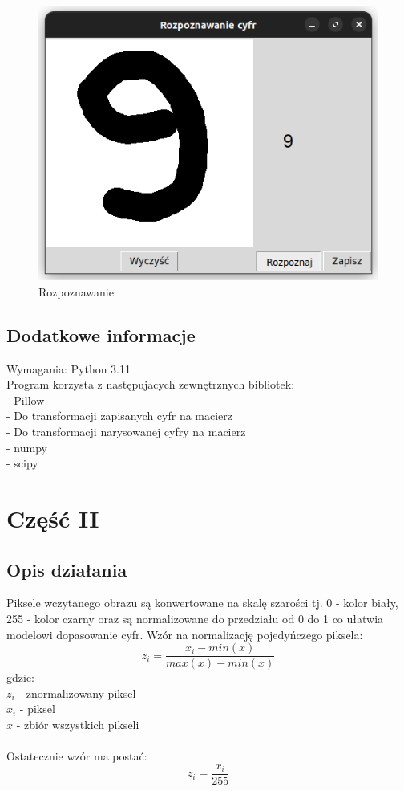 \documentclass[12pt,a4paper]{article}
\begin{document}
\begin{figure}[!h]
	\includegraphics{"app2.png"}
	\centering
	\caption{Rozpoznawanie}
\end{figure}
\subsection*{Dodatkowe informacje}
Wymagania:
Python 3.11\\
Program korzysta z następujacych zewnętrznych bibliotek:\\
- Pillow\\
\indent - Do transformacji zapisanych cyfr na macierz\\
\indent - Do transformacji narysowanej cyfry na macierz\\
- numpy\\
- scipy
\newpage
\section*{Część II}
\subsection*{Opis działania}
Piksele wczytanego obrazu są konwertowane na skalę szarości tj. 0 - kolor biały, 255 - kolor czarny
oraz są normalizowane do przedziału od 0 do 1 co ułatwia modelowi dopasowanie cyfr.
Wzór na normalizację pojedyńczego piksela:
\[
	z_i=\frac{x_i - min(x)}{max(x) - min(x)}
\]
gdzie: \\
\indent $z_i$ - znormalizowany piksel\\
\indent $x_i$ - piksel\\
\indent $x$ - zbiór wszystkich pikseli\\~\\
Ostatecznie wzór ma postać:
\[
	z_i=\frac{x_i}{255}
\]
\end{document}

